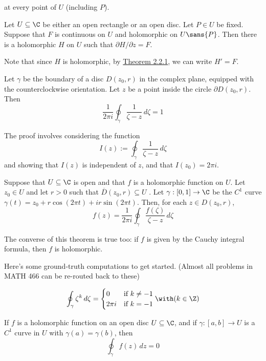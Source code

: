 at every point of $U$ (including $P$).

\label{b2d9d89}

Let $U\subseteq\C$ be either an open rectangle or an open disc. Let $P\in U$ be
fixed. Suppose that $F$ is continuous on $U$ and holomorphic on $U\sans{P}$.
Then there is a holomorphic $H$ on $U$ such that $\partial H/\partial z=F$.

Note that since $H$ is holomorphic, by \href{f75e43c}{Theorem 2.2.1}, we can
write $H'=F$.

\label{c6c594a}

Let $\gamma$ be the boundary of a disc $D(z_0,r)$ in the complex plane,
equipped with the counterclockwise orientation. Let $z$ be a point inside the
circle $\partial D(z_0,r)$. Then
$$
  \frac1{2\pi i}\oint_\gamma\frac1{\zeta-z}\,d\zeta=1
$$

The proof involves considering the function
$$
  I(z):=\oint_\gamma\frac1{\zeta-z}\,d\zeta
$$
and showing that $I(z)$ is independent of $z$, and that $I(z_0)=2\pi i$.

\label{e50677f}

Suppose that $U\subseteq\C$ is open and that $f$ is a holomorphic function on
$U$. Let $z_0\in U$ and let $r>0$ such that $\overline D(z_0,r)\subseteq U$ .
Let $\gamma:[0,1]\to\C$ be the $C^1$ curve $\gamma(t)=z_0+r\cos(2\pi
t)+ir\sin(2\pi t)$. Then, for each $z\in D(z_0,r)$,
$$
  f(z)=\frac1{2\pi i}\oint_\gamma\frac{f(\zeta)}{\zeta-z}\,d\zeta
$$

The converse of this theorem is true too: if $f$ is given by the Cauchy
integral formula, then $f$ is holomorphic.

\label{da0d68d}

Here's some ground-truth computations to get started. (Almost all problems in
MATH 466 can be re-routed back to these)

$$
  \oint_\gamma\zeta^k\,d\zeta=\begin{cases}
    0      & \text{if }k\neq-1 \\
    2\pi i & \text{if }k=-1
  \end{cases}\with(k\in\Z)
$$

\label{fb87a78}

If $f$ is a holomorphic function on an open disc $U\subseteq\C$, and if
$\gamma:[a,b]\to U$ is a $C^1$ curve in $U$ with $\gamma(a)=\gamma(b)$, then
$$\oint_\gamma f(z)\,dz=0$$

